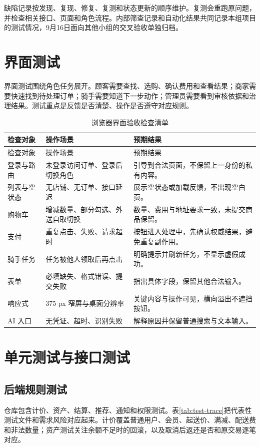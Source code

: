 缺陷记录按发现、复现、修复、复测和状态更新的顺序维护。复测会重跑原问题，并检查相关接口、页面和角色流程。内部筛查记录和自动化结果共同记录本组项目的测试情况，9月16日面向其他小组的交叉验收单独归档。
\section{界面测试}
界面测试围绕角色任务展开。顾客需要查找、选购、确认费用和查看结果；商家需要快速找到待处理订单；骑手需要知道下一步动作；管理员需要看到审核依据和治理结果。测试重点是反馈是否清楚、操作是否遵守对应规则。
\begin{longtable}{L{.19\linewidth}L{.35\linewidth}L{.37\linewidth}}
\caption{浏览器界面验收检查清单}\label{tab:ui-checklist}\\\toprule 检查对象&操作场景&预期结果\\\midrule\endfirsthead\toprule 检查对象&操作场景&预期结果\\\midrule\endhead
登录与路由&未登录访问订单、登录后切换角色&引导到合法页面，不保留上一身份的私有内容。\\
列表与空状态&无店铺、无订单、接口延迟&展示空状态或加载反馈，不出现空白页。\\
购物车&增减数量、部分勾选、外送自取切换&数量、费用与地址要求一致，未提交商品保留。\\
支付&重复点击、失败、请求超时&按钮进入处理中，先确认权威结果，避免重复副作用。\\
骑手任务&任务被他人领取后再点击&明确提示并刷新任务，不显示虚假成功。\\
表单&必填缺失、格式错误、提交失败&指出具体字段，保留其他合法输入。\\
响应式&375 px 窄屏与桌面分辨率&关键内容与操作可见，横向溢出不遮挡按钮。\\
AI 入口&无凭证、超时、识别失败&解释原因并保留普通搜索与文本输入。\\\bottomrule
\end{longtable}
\section{单元测试与接口测试}
\subsection{后端规则测试}
仓库包含计价、资产、结算、推荐、通知和权限测试。表\ref{tab:test-trace}把代表性测试文件和需求风险对应起来。计价覆盖普通用户、会员、起送价、满减、配送费和非法数量；资产测试关注余额不足时的回滚，以及取消后返还是否和原交易逐笔对应。

